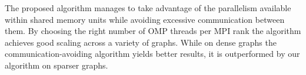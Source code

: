 The proposed algorithm manages to take advantage of the parallelism available within shared memory units while avoiding excessive communication between them. By choosing the right number of OMP threads per MPI rank the algorithm achieves good scaling across a variety of graphs. While on dense graphs the communication-avoiding algorithm \cite{comm_avoiding} yields better results, it is outperformed by our algorithm on sparser graphs. 